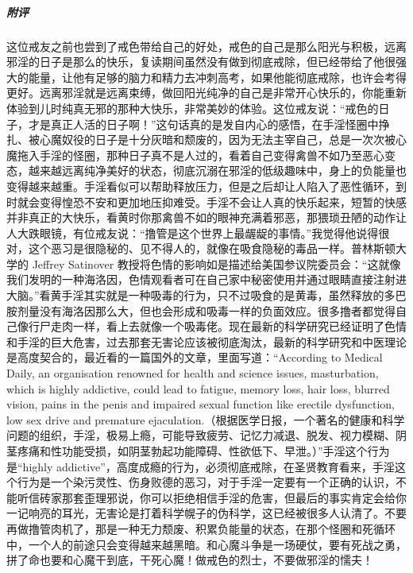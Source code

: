 \begin{case}
    \subparagraph{附评} 这位戒友之前也尝到了戒色带给自己的好处，戒色的自己是那么阳光与积极，远离邪淫的日子是那么的快乐，复读期间虽然没有做到彻底戒除，但已经带给了他很强大的能量，让他有足够的脑力和精力去冲刺高考，如果他能彻底戒除，也许会考得更好。远离邪淫就是远离束缚，做回阳光纯净的自己是非常开心快乐的，你能重新体验到儿时纯真无邪的那种大快乐，非常美妙的体验。这位戒友说：“戒色的日子，才是真正人活的日子啊！”这句话真的是发自内心的感悟，在手淫怪圈中挣扎、被心魔奴役的日子是十分灰暗和颓废的，因为无法主宰自己，总是一次次被心魔拖入手淫的怪圈，那种日子真不是人过的，看着自己变得禽兽不如乃至恶心变态，越来越远离纯净美好的状态，彻底沉溺在邪淫的低级趣味中，身上的负能量也变得越来越重。手淫看似可以帮助释放压力，但是之后却让人陷入了恶性循环，到时就会变得惶恐不安和更加地压抑难受。手淫不会让人真的快乐起来，短暂的快感并非真正的大快乐，看黄时你那禽兽不如的眼神充满着邪恶，那猥琐丑陋的动作让人大跌眼镜，有位戒友说：“撸管是这个世界上最龌龊的事情。”我觉得他说得很对，这个恶习是很隐秘的、见不得人的，就像在吸食隐秘的毒品一样。普林斯顿大学的 Jeffrey Satinover 教授将色情的影响如是描述给美国参议院委员会：“这就像我们发明的一种海洛因，色情观看者可在自己家中秘密使用并通过眼睛直接注射进大脑。”看黄手淫其实就是一种吸毒的行为，只不过吸食的是黄毒，虽然释放的多巴胺剂量没有海洛因那么大，但也会形成和吸毒一样的负面效应。很多撸者都觉得自己像行尸走肉一样，看上去就像一个吸毒佬。现在最新的科学研究已经证明了色情和手淫的巨大危害，过去那套无害论应该被彻底淘汰，最新的科学研究和中医理论是高度契合的，最近看的一篇国外的文章，里面写道：“According to Medical Daily, an organisation renowned for health and science issues, masturbation, which is highly addictive, could lead to fatigue, memory loss, hair loss, blurred vision, pains in the penis and impaired sexual function like erectile dysfunction, low sex drive and premature ejaculation.（根据医学日报，一个著名的健康和科学问题的组织，手淫，极易上瘾，可能导致疲劳、记忆力减退、脱发、视力模糊、阴茎疼痛和性功能受损，如阴茎勃起功能障碍、性欲低下、早泄。）”手淫这个行为是“highly addictive”，高度成瘾的行为，必须彻底戒除，在圣贤教育看来，手淫这个行为是一个染污灵性、伤身败德的恶习，对于手淫一定要有一个正确的认识，不能听信砖家那套歪理邪说，你可以拒绝相信手淫的危害，但最后的事实肯定会给你一记响亮的耳光，无害论是打着科学幌子的伪科学，这已经被很多人认清了。不要再做撸管肉机了，那是一种无力颓废、积累负能量的状态，在那个怪圈和死循环中，一个人的前途只会变得越来越黑暗。和心魔斗争是一场硬仗，要有死战之勇，拼了命也要和心魔干到底，干死心魔！做戒色的烈士，不要做邪淫的懦夫！
\end{case}

